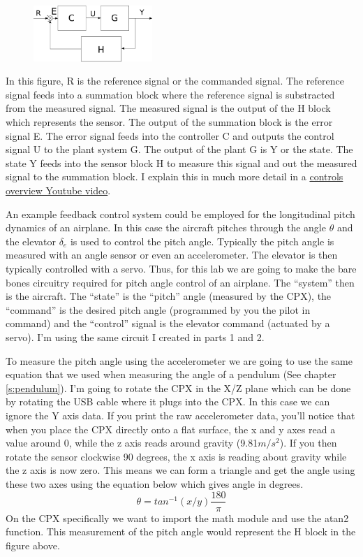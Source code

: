 \begin{figure}[H]
  \begin{center}
    \includegraphics[width=0.4\textwidth]{Figures/feedback.png}
  \end{center}
\end{figure}
In this figure, R is the reference signal or the commanded signal. The reference signal feeds into a summation block where the reference signal is substracted from the measured signal. The measured signal is the output of the H block which represents the sensor. The output of the summation block is the error signal E. The error signal feeds into the controller C and outputs the control signal U to the plant system G. The output of the plant G is Y or the state. The state Y feeds into the sensor block H to measure this signal and out the measured signal to the summation block. I explain this in much more detail in a
\href{https://www.youtube.com/watch?v=PAK5V8wzVXY&list=PL_D7_GvGz-v30U58EUUOdJGgO4u75DXoB&index=1}{controls
  overview Youtube video}. 

An example feedback control system could be employed for the longitudinal pitch dynamics of an airplane. In this case the aircraft pitches through the angle $\theta$ and the elevator $\delta_e$ is used to control the pitch angle. Typically the pitch angle is measured with an angle sensor or even an accelerometer. The elevator is then typically controlled with a servo. Thus, for this lab we are going to make the bare
bones circuitry required for pitch angle control of an airplane. The
“system” then is the aircraft. The “state” is the “pitch” angle
(measured by the CPX), the “command” is the desired pitch angle
(programmed by you the pilot in command) and the “control” signal is
the elevator command (actuated by a servo). I’m using the same circuit
I created in parts 1 and 2.

To measure the pitch angle using the accelerometer we are going to use the same equation that we used when measuring the angle of a pendulum (See chapter \ref{s:pendulum}). I’m going to rotate the CPX in the X/Z plane which can be done by rotating the USB cable where it plugs into the CPX. In this case we can ignore the Y axis data. If you print the raw accelerometer data, you’ll notice that when you place the CPX directly onto a flat surface, the x and y axes read a value around 0, while the z axis reads around gravity (9.81$m/s^2$). If you then rotate the sensor clockwise 90 degrees, the x axis is reading about gravity while the z axis is now zero. This means we can form a triangle and get the angle using these two axes using the equation below which gives angle in degrees.
\begin{equation}
\theta = tan^{-1}(x/y)\frac{180}{\pi}
\end{equation}
On the CPX specifically we want to import the math module and use the atan2 function. This measurement of the pitch angle would represent the H block in the figure above. 

